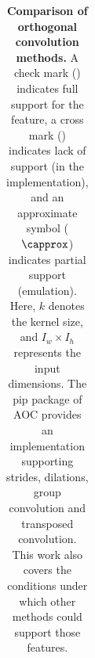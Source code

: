 \begin{table}[ht]
\begin{tabular}{llp{17mm}cccccc}
    \end{tabular}
    \caption{\textbf{Comparison of orthogonal convolution methods.} A check mark (\cmark) indicates full support for the feature, a cross mark (\xmark) indicates lack of support (in the implementation), and an approximate symbol ($\capprox$) indicates partial support (emulation). Here, $k$ denotes the kernel size, and $I_w \times I_h$ represents the input dimensions. The pip package of AOC provides an implementation supporting strides, dilations, group convolution and transposed convolution. This work also covers the conditions under which other methods could support those features.  %
}
    \label{tab:big_picture}
\end{table}




